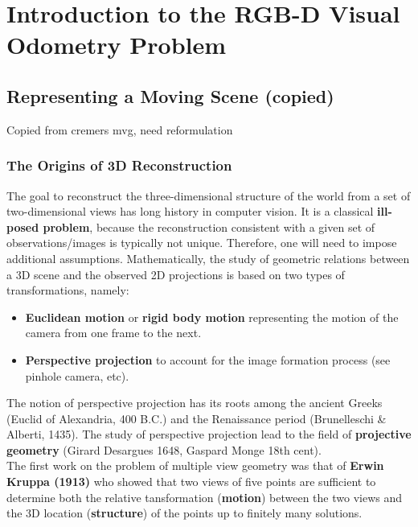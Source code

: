 \chapter{Introduction to the RGB-D Visual Odometry Problem}%
\label{cha:rgbd_vo}

\minitoc%

\section{Representing a Moving Scene (copied)}%
\label{sec:moving-scene}

\alert{Copied from cremers mvg, need reformulation}

\subsection{The Origins of 3D Reconstruction}%
\label{sub:the_origins_of_3d_reconstruction}

The goal to reconstruct the three-dimensional structure of the world from
a set of two-dimensional views has long history in computer vision.
It is a classical \textbf{ill-posed problem}, because the reconstruction
consistent with a given set of observations/images is typically not unique.
Therefore, one will need to impose additional assumptions.
Mathematically, the study of geometric relations between a 3D scene
and the observed 2D projections is based on two types of transformations, namely:
\begin{itemize}
	\item \textbf{Euclidean motion} or \textbf{rigid body motion}
		representing the motion of the camera from one frame to the next.
	\item \textbf{Perspective projection} to account for the image formation
		process (see pinhole camera, etc).
\end{itemize}

The notion of perspective projection has its roots among the ancient Greeks
(Euclid of Alexandria, \roughly{} 400 B.C.) and the Renaissance period
(Brunelleschi \& Alberti, 1435).
The study of perspective projection lead to the field of
\textbf{projective geometry} (Girard Desargues 1648, Gaspard Monge 18th cent).\\

The first work on the problem of multiple view geometry was that of
\textbf{Erwin Kruppa (1913)} who showed that two views of five points
are sufficient to determine both the relative tansformation
(\textbf{motion}) between the two views and the 3D location (\textbf{structure})
of the points up to finitely many solutions.\\

